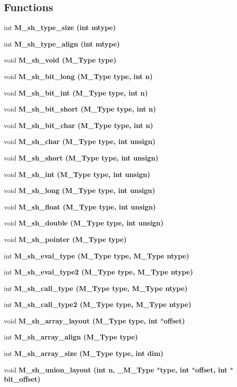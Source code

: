 \subsection*{Functions}
\begin{CompactItemize}
\item 
int \bf{M\_\-sh\_\-type\_\-size} (int mtype)
\item 
int \bf{M\_\-sh\_\-type\_\-align} (int mtype)
\item 
void \bf{M\_\-sh\_\-void} (\bf{M\_\-Type} type)
\item 
void \bf{M\_\-sh\_\-bit\_\-long} (\bf{M\_\-Type} type, int n)
\item 
void \bf{M\_\-sh\_\-bit\_\-int} (\bf{M\_\-Type} type, int n)
\item 
void \bf{M\_\-sh\_\-bit\_\-short} (\bf{M\_\-Type} type, int n)
\item 
void \bf{M\_\-sh\_\-bit\_\-char} (\bf{M\_\-Type} type, int n)
\item 
void \bf{M\_\-sh\_\-char} (\bf{M\_\-Type} type, int unsign)
\item 
void \bf{M\_\-sh\_\-short} (\bf{M\_\-Type} type, int unsign)
\item 
void \bf{M\_\-sh\_\-int} (\bf{M\_\-Type} type, int unsign)
\item 
void \bf{M\_\-sh\_\-long} (\bf{M\_\-Type} type, int unsign)
\item 
void \bf{M\_\-sh\_\-float} (\bf{M\_\-Type} type, int unsign)
\item 
void \bf{M\_\-sh\_\-double} (\bf{M\_\-Type} type, int unsign)
\item 
void \bf{M\_\-sh\_\-pointer} (\bf{M\_\-Type} type)
\item 
int \bf{M\_\-sh\_\-eval\_\-type} (\bf{M\_\-Type} type, \bf{M\_\-Type} ntype)
\item 
int \bf{M\_\-sh\_\-eval\_\-type2} (\bf{M\_\-Type} type, \bf{M\_\-Type} ntype)
\item 
int \bf{M\_\-sh\_\-call\_\-type} (\bf{M\_\-Type} type, \bf{M\_\-Type} ntype)
\item 
int \bf{M\_\-sh\_\-call\_\-type2} (\bf{M\_\-Type} type, \bf{M\_\-Type} ntype)
\item 
void \bf{M\_\-sh\_\-array\_\-layout} (\bf{M\_\-Type} type, int $\ast$offset)
\item 
int \bf{M\_\-sh\_\-array\_\-align} (\bf{M\_\-Type} type)
\item 
int \bf{M\_\-sh\_\-array\_\-size} (\bf{M\_\-Type} type, int dim)
\item 
void \bf{M\_\-sh\_\-union\_\-layout} (int n, \bf{\_\-M\_\-Type} $\ast$type, int $\ast$offset, int $\ast$bit\_\-offset)

\end{CompactItemize}
